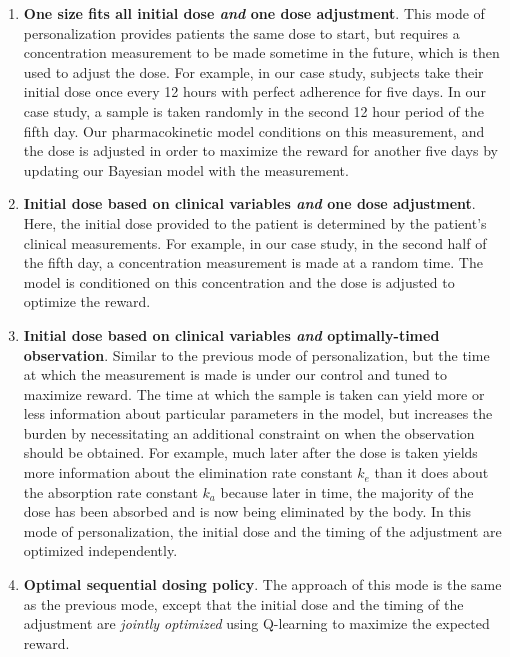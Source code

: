 \begin{enumerate}
	\item \textbf{One size fits all initial dose \textit{and} one dose adjustment}.  This mode of personalization provides patients the same dose to start, but requires a concentration measurement to be made sometime in the future, which is then used to adjust the dose.  For example, in our case study, subjects take their initial dose once every 12 hours with perfect adherence for five days. In our case study, a sample is taken randomly in the second 12 hour period of the fifth day.  Our pharmacokinetic model conditions on this measurement, and the dose is adjusted in order to maximize the reward for another five days by updating our Bayesian model with the measurement.
	
	\item \textbf{Initial dose based on clinical variables \textit{and} one dose adjustment}.  Here, the initial dose provided to the patient is determined by the patient's clinical measurements. For example, in our case study, in the second half of the fifth day, a concentration measurement is made at a random time. The model is conditioned on this concentration and the dose is adjusted to optimize the reward.
	
	\item \textbf{Initial dose based on clinical variables \textit{and} optimally-timed observation}.  Similar to the previous mode of personalization, but the time at which the measurement is made is under our control and tuned to maximize reward. The time at which the sample is taken can yield more or less information about particular parameters in the model, but increases the burden by necessitating an additional constraint on when the observation should be obtained. For example, much later after the dose is taken yields more information about the elimination rate constant $k_e$ than it does about the absorption rate constant $k_a$ because later in time, the majority of the dose has been absorbed and is now being eliminated by the body. In this mode of personalization, the initial dose and the timing of the adjustment are optimized independently. 
	
	\item \textbf{Optimal sequential dosing policy}. The approach of this mode is the same as the previous mode, except that the initial dose and the timing of the adjustment are \textit{jointly optimized} using Q-learning to maximize the expected reward.
\end{enumerate}


